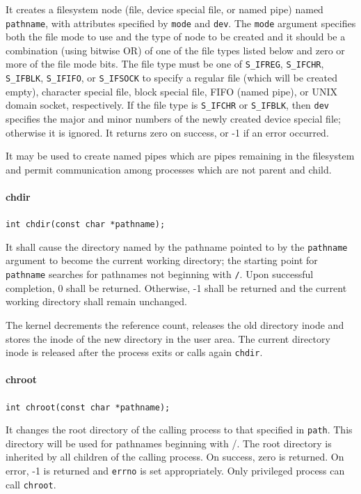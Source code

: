 It creates a filesystem node (file, device special file, or named pipe) named \texttt{pathname}, with attributes specified by \texttt{mode} and \texttt{dev}. The \texttt{mode} argument specifies both the file mode to use and the type of node to be created and it should be a combination (using bitwise OR) of one of the file types listed below and zero or more of the file mode bits. The file type must be one of \texttt{S\_IFREG}, \texttt{S\_IFCHR}, \texttt{S\_IFBLK}, \texttt{S\_IFIFO}, or \texttt{S\_IFSOCK} to specify a regular file (which will be created empty), character special file, block special file, FIFO (named pipe), or UNIX domain socket, respectively. If the file type is \texttt{S\_IFCHR} or \texttt{S\_IFBLK}, then \texttt{dev} specifies the major and minor numbers of the newly created device special file; otherwise it is ignored. It returns zero on success, or -1 if an error occurred.

It may be used to create named pipes which are pipes remaining in the filesystem and permit communication among processes which are not parent and child.

\paragraph{chdir}
\texttt{int chdir(const char *pathname);}

It shall cause the directory named by the pathname pointed to by the \texttt{pathname} argument to become the current working directory; the starting point for \texttt{pathname} searches for pathnames not beginning with \texttt{/}. Upon successful completion, 0 shall be returned. Otherwise, -1 shall be returned and the current working directory shall remain unchanged. 

The kernel decrements the reference count, releases the old directory inode and stores the inode of the new directory in the user area. The current directory inode is released after the process exits or calls again \texttt{chdir}.

\paragraph{chroot}
\texttt{int chroot(const char *pathname);}

It changes the root directory of the calling process to that specified in \texttt{path}. This directory will be used for pathnames beginning with /. The root directory is inherited by all children of the calling process. On success, zero is returned. On error, -1 is returned and \texttt{errno} is set appropriately. Only privileged process can call \texttt{chroot}.

